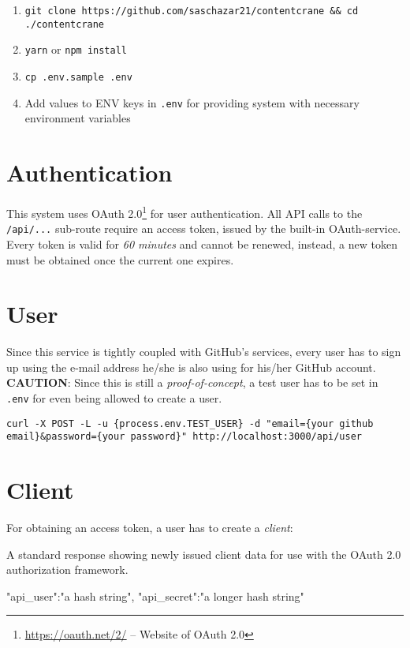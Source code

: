 \documentclass[a4paper,english,11pt]{report}
\begin{document}
\begin{enumerate}
  \item \texttt{git clone https://github.com/saschazar21/contentcrane \&\& cd ./contentcrane}
  \item \texttt{yarn} or \texttt{npm install}
  \item \texttt{cp .env.sample .env}
  \item Add values to ENV keys in \texttt{.env} for providing system with necessary environment variables
\end{enumerate}
%

\section{Authentication}
This system uses OAuth 2.0\footnote{\url{https://oauth.net/2/} -- Website of OAuth 2.0} for user authentication. All API calls to the \texttt{/api/...} sub-route require an access token, issued by the built-in OAuth-service. Every token is valid for \emph{60 minutes} and cannot be renewed, instead, a new token must be obtained once the current one expires.


\section{User}
Since this service is tightly coupled with GitHub's services, every user has to sign up using the e-mail address he/she is also using for his/her GitHub account.\\
\textbf{CAUTION}: Since this is still a \emph{proof-of-concept}, a test user has to be set in \texttt{.env} for even being allowed to create a user.

\begin{center}
  \texttt{curl -X POST -L -u \{process.env.TEST\_USER\} -d "email=\{your github email\}\&password=\{your password\}" http://localhost:3000/api/user}
\end{center}


\section{Client}
For obtaining an access token, a user has to create a \emph{client}:

\begin{program}
  \caption{A standard response showing newly issued client data for use with the OAuth 2.0 authorization framework.}
  \label{prog:client_response}
  \begin{JsCode}
{
  "api_user":"{a hash string}",
  "api_secret":"{a longer hash string}"
}
  \end{JsCode}
\end{program}
\end{document}
